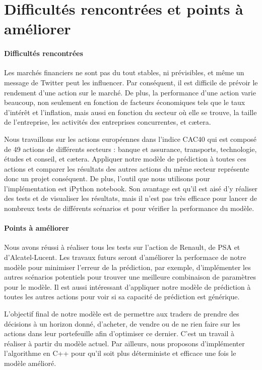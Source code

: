 \section{Difficultés rencontrées et points à améliorer}

\paragraph{Difficultés rencontrées}
Les marchés financiers ne sont pas du tout stables, ni prévisibles, et même un message de Twitter peut les influencer. Par conséquent, il est difficile de prévoir le rendement d'une action sur le marché. De plus, la performance d'une action varie beaucoup, non seulement en fonction de facteurs économiques tels que le taux d'intérêt et l'inflation, mais aussi en fonction du secteur où elle se trouve, la taille de l'entreprise, les activités des entreprises concurrentes, et cætera.

Nous travaillons sur les actions européennes dans l'indice CAC40 qui est composé de 49 actions de différents secteurs : banque et assurance, transports, technologie, études et conseil, et cætera. Appliquer notre modèle de prédiction à toutes ces actions et comparer les résultats des autres actions du même secteur représente donc un projet conséquent. De plus, l'outil que nous utilisons pour l'implémentation est iPython notebook. Son avantage est qu'il est aisé d'y réaliser des tests et de visualiser les résultats, mais il n'est pas très efficace pour lancer de nombreux tests de différents scénarios et pour vérifier la performance du modèle.\\

\paragraph{Points à améliorer}
Nous avons réussi à réaliser tous les tests sur l'action de Renault, de PSA et d'Alcatel-Lucent. Les travaux futurs seront d'améliorer la performace de notre modèle pour minimiser l'erreur de la prédiction, par exemple, d'implémenter les autres scénarios potentiels pour trouver une meilleure combinaison de paramètres pour le modèle. Il est aussi intéressant d'appliquer notre modèle de prédiction à toutes les autres actions pour voir si sa capacité de prédiction est générique.

L'objectif final de notre modèle est de permettre aux traders de prendre des décisions à un horizon donné, d'acheter, de vendre ou de ne rien faire sur les actions dans leur portefeuille afin d'optimiser ce dernier. C'est un travail à réaliser à partir du modèle actuel. Par ailleurs, nous proposons d'implémenter l'algorithme en C++ pour qu'il soit plus déterministe et efficace une fois le modèle amélioré.